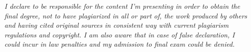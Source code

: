 
\thispagestyle{plain}
\vspace*{\fill}
\textit{I declare to be responsible for the content I'm presenting in order to
obtain the final degree, not to have plagiarized in all or part of, the
work produced by others and having cited original sources in consistent
way with current plagiarism regulations and copyright. I am also aware
that in case of false declaration, I could incur in law penalties and my
admission to final exam could be denied.}
\vspace*{\fill}